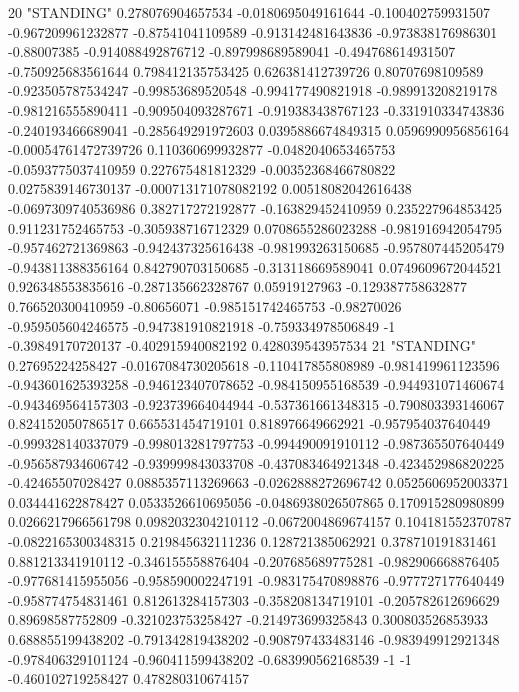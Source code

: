 20 "STANDING" 0.278076904657534 -0.0180695049161644 -0.100402759931507 -0.967209961232877 -0.87541041109589 -0.913142481643836 -0.973838176986301 -0.88007385 -0.914088492876712 -0.897998689589041 -0.494768614931507 -0.750925683561644 0.798412135753425 0.626381412739726 0.80707698109589 -0.923505787534247 -0.99853689520548 -0.994177490821918 -0.989913208219178 -0.981216555890411 -0.909504093287671 -0.919383438767123 -0.331910334743836 -0.240193466689041 -0.285649291972603 0.0395886674849315 0.0596990956856164 -0.00054761472739726 0.110360699932877 -0.0482040653465753 -0.0593775037410959 0.227675481812329 -0.00352368466780822 0.0275839146730137 -0.000713171078082192 0.00518082042616438 -0.0697309740536986 0.382717272192877 -0.163829452410959 0.235227964853425 0.911231752465753 -0.305938716712329 0.0708655286023288 -0.981916942054795 -0.957462721369863 -0.942437325616438 -0.981993263150685 -0.957807445205479 -0.943811388356164 0.842790703150685 -0.313118669589041 0.0749609672044521 0.926348553835616 -0.287135662328767 0.05919127963 -0.129387758632877 0.766520300410959 -0.80656071 -0.985151742465753 -0.98270026 -0.959505604246575 -0.947381910821918 -0.759334978506849 -1 -0.39849170720137 -0.402915940082192 0.428039543957534
21 "STANDING" 0.27695224258427 -0.0167084730205618 -0.110417855808989 -0.981419961123596 -0.943601625393258 -0.946123407078652 -0.984150955168539 -0.944931071460674 -0.943469564157303 -0.923739664044944 -0.537361661348315 -0.790803393146067 0.824152050786517 0.665531454719101 0.818976649662921 -0.957954037640449 -0.999328140337079 -0.998013281797753 -0.994490091910112 -0.987365507640449 -0.956587934606742 -0.939999843033708 -0.437083464921348 -0.423452986820225 -0.42465507028427 0.0885357113269663 -0.0262888272696742 0.0525606952003371 0.034441622878427 0.0533526610695056 -0.0486938026507865 0.170915280980899 0.0266217966561798 0.0982032304210112 -0.0672004869674157 0.104181552370787 -0.0822165300348315 0.219845632111236 0.128721385062921 0.378710191831461 0.881213341910112 -0.346155558876404 -0.207685689775281 -0.982906668876405 -0.977681415955056 -0.958590002247191 -0.983175470898876 -0.977727177640449 -0.958774754831461 0.812613284157303 -0.358208134719101 -0.205782612696629 0.89698587752809 -0.321023753258427 -0.214973699325843 0.300803526853933 0.688855199438202 -0.791342819438202 -0.908797433483146 -0.983949912921348 -0.978406329101124 -0.960411599438202 -0.683990562168539 -1 -1 -0.460102719258427 0.478280310674157
